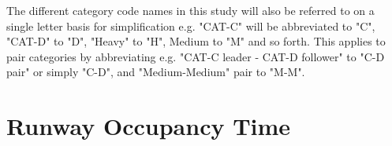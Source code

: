 \begin{table}[h]
\centering
{}
\caption[RECAT-EU distance-based separation minima]{RECAT-EU wake turbulence distance-based separation minima on approach and departure. (*) means minimum radar separation (MRS), set at 2.5 NM, applicable as per current ICAO doc 4444 provisions \cite{doc44444, rooseleer2015recat, noauthor_recat_2018}.}
\label{tab:RECAT-dist}
\end{table}

The different category code names in this study will also be referred to on a single letter basis for simplification e.g. "CAT-C" will be abbreviated to "C", "CAT-D" to "D", "Heavy" to "H", Medium to "M" and so forth. This applies to pair categories by abbreviating e.g. "CAT-C leader - CAT-D follower"  to "C-D pair" or simply "C-D", and "Medium-Medium" pair to "M-M".

\section{Runway Occupancy Time\label{sec:ROT}}

